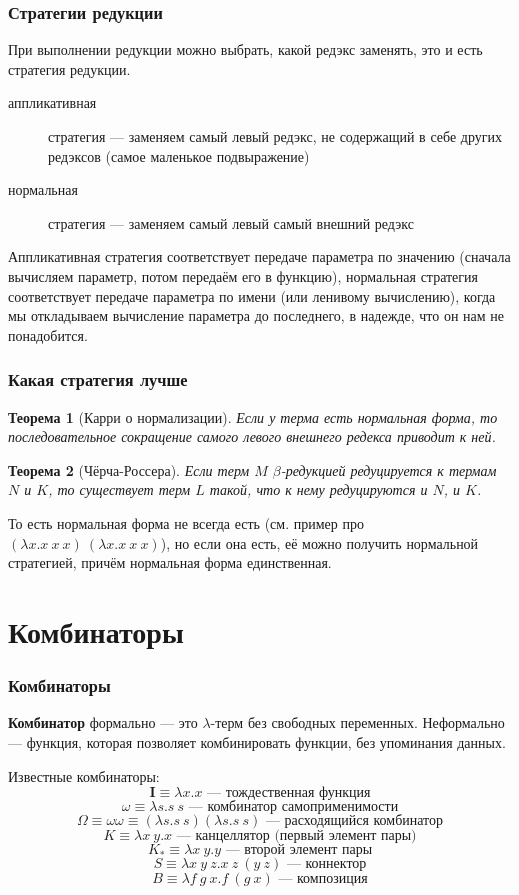 \documentclass[xetex,mathserif,serif]{beamer}
\newtheorem{rustheorem}{Теорема}
\begin{document}
    \begin{frame}
        \frametitle{Стратегии редукции}
        При выполнении редукции можно выбрать, какой редэкс заменять, это и есть стратегия редукции.
        \begin{description}
            \item[аппликативная] стратегия --- заменяем самый левый редэкс, не содержащий в себе других 
                    редэксов (самое маленькое подвыражение)
            \item[нормальная] стратегия --- заменяем самый левый самый внешний редэкс
        \end{description}
        Аппликативная стратегия соответствует передаче параметра по значению (сначала вычисляем параметр, потом 
        передаём его в функцию), нормальная стратегия соответствует передаче параметра по имени (или ленивому вычислению),
        когда мы откладываем вычисление параметра до последнего, в надежде, что он нам не понадобится.
    \end{frame}

    \begin{frame}
        \frametitle{Какая стратегия лучше}
        \begin{rustheorem}[Карри о нормализации]
            Если у терма есть нормальная форма, то последовательное сокращение самого левого внешнего 
            редекса приводит к ней.
        \end{rustheorem}
        \begin{rustheorem}[Чёрча-Россера]
            Если терм $M$ $\beta$-редукцией редуцируется к термам $N$ и $K$, то существует терм $L$ такой, что
            к нему редуцируются и $N$, и $K$.
        \end{rustheorem}
        То есть нормальная форма не всегда есть (см. пример про $(\lambda x.x\ x\ x)\ (\lambda x.x\ x\ x)$), но
        если она есть, её можно получить нормальной стратегией, причём нормальная форма единственная.
    \end{frame}

    \section{Комбинаторы}

    \begin{frame}
        \frametitle{Комбинаторы}
        \textbf{Комбинатор} формально --- это $\lambda$-терм без свободных переменных. Неформально --- функция,
        которая позволяет комбинировать функции, без упоминания данных.
        
        Известные комбинаторы:
        $$\textbf{I} \equiv \lambda x.x \mbox{ --- тождественная функция}$$
        $$\omega \equiv \lambda s.s\ s \mbox{ --- комбинатор самоприменимости}$$
        $$\Omega \equiv \omega\omega \equiv (\lambda s.s\ s) (\lambda s.s\ s) \mbox{ --- расходящийся комбинатор}$$
        $$K \equiv \lambda x\ y.x \mbox{ --- канцеллятор (первый элемент пары)}$$
        $$K_\ast \equiv \lambda x\ y.y \mbox{ --- второй элемент пары}$$
        $$S \equiv \lambda x\ y\ z. x\ z\ (y\ z) \mbox{ --- коннектор}$$
        $$B \equiv \lambda f\ g\ x. f\ (g\ x) \mbox{ --- композиция}$$		
    \end{frame}
    
\end{document}
